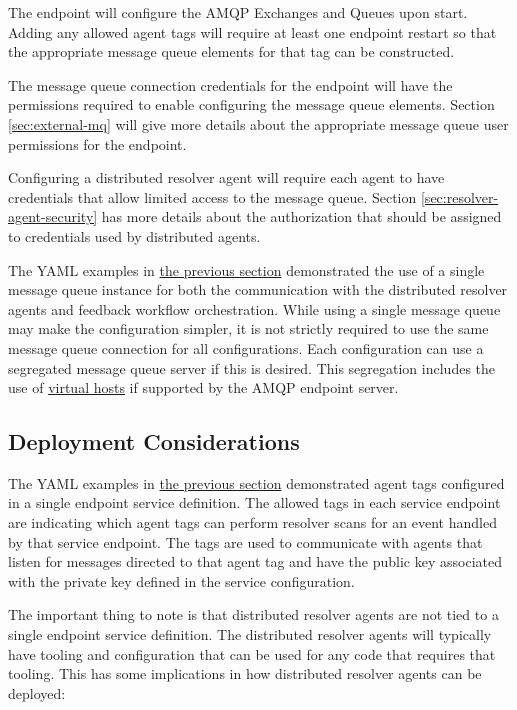 The \cxoneflow endpoint will configure the AMQP Exchanges and Queues upon start.  Adding any
allowed agent tags will require at least one \cxoneflow endpoint restart so that the
appropriate message queue elements for that tag can be constructed.

The message queue connection credentials for the \cxoneflow endpoint will have the 
permissions required to enable configuring the message queue elements.  Section \ref{sec:external-mq}
will give more details about the appropriate message queue user permissions for the \cxoneflow endpoint.

Configuring a distributed resolver agent will require each agent to have credentials that allow limited
access to the message queue.  Section \ref{sec:resolver-agent-security} has more details about the
authorization that should be assigned to credentials used by distributed agents.

The YAML examples in \hyperref[sec:resolver-yaml-config]{the previous section} demonstrated the use of a single
message queue instance for both the communication with the distributed resolver agents and feedback workflow
orchestration.  While using a single message queue may make the \cxoneflow configuration simpler, it is not
strictly required to use the same message queue connection for all configurations.  Each configuration can
use a segregated message queue server if this is desired.  This segregation includes the use
of \href{https://www.rabbitmq.com/docs/vhosts}{virtual hosts} if supported by the AMQP endpoint server.


\subsection{Deployment Considerations}

The YAML examples in \hyperref[sec:resolver-yaml-config]{the previous section} demonstrated agent tags
configured in a single endpoint service definition.  The allowed tags in each service endpoint are
indicating which agent tags can perform resolver scans for an event handled by that service endpoint.
The tags are used to communicate with agents that listen for messages directed to that agent tag and
have the public key associated with the private key defined in the service configuration.

The important thing to note is that distributed resolver agents are not tied to a single
\cxoneflow endpoint service definition.  The distributed resolver agents will typically have
tooling and configuration that can be used for any code that requires that tooling.  This
has some implications in how distributed resolver agents can be deployed:

